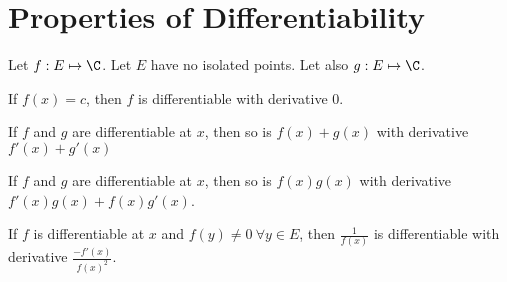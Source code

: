 \documentclass[../Main.tex]{subfiles}
\begin{document}
\section{Properties of Differentiability}
\begin{propositions}{
        Let $f : E \mapsto \C$. Let $E$ have no isolated points. Let also $g : E \mapsto \C$.
        \label{propsDiffProperties}
    }
    \item If $f(x) = c$, then $f$ is differentiable with derivative 0. \label{propConstantDiffability}    
    \item If $f$ and $g$ are differentiable at $x$, then so is $f(x) + g(x)$ with derivative $f'(x) + g'(x)$ \label{propSumDiffability}
    \item If $f$ and $g$ are differentiable at $x$, then so is $f(x)g(x)$ with derivative $f'(x) g(x) + f(x) g'(x)$. \label{propProdDiffability}
    \item If $f$ is differentiable at $x$ and $f(y) \neq 0~\forall y \in E$, then $\frac{1}{f(x)}$ is differentiable with derivative $\frac{-f'(x)}{f(x)^2}$. \label{propReciprocalDiffability}
\end{propositions}
\end{document}
